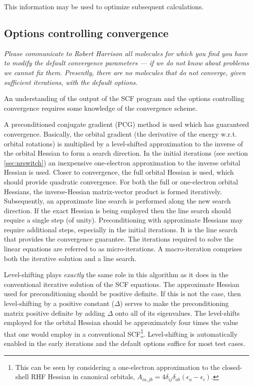 This information may be used to optimize subsequent calculations.


\subsection{Options controlling convergence}
\label{sec:scfconv}

{\em Please communicate to Robert Harrison all molecules for which you
  find you have to modify the default convergence parameters --- if we
  do not know about problems we cannot fix them.  Presently, there are
  no molecules that do not converge, given sufficient iterations, with
  the default options.}

An understanding of the output of the SCF program and the options
controlling convergence requires some knowledge of the convergence
scheme.

A preconditioned conjugate gradient (PCG) method is used which has
guaranteed convergence.  Basically, the orbital gradient (the
derivative of the energy w.r.t. orbital rotations) is multiplied by a
level-shifted approximation to the inverse of the orbital Hessian to
form a search direction.  In the initial iterations (see section
\ref{sec:nrswitch}) an inexpensive one-electron approximation to the
inverse orbital Hessian is used.  Closer to convergence, the full
orbital Hessian is used, which should provide quadratic convergence.
For both the full or one-electron orbital Hessians, the
inverse-Hessian matrix-vector product is formed iteratively.
Subsequently, an approximate line search is performed along the new
search direction.  If the exact Hessian is being employed then the
line search should require a single step (of unity).  Preconditioning
with approximate Hessians may require additional steps, especially in
the initial iterations.  It is the line search that provides the
convergence guarantee.  The iterations required to solve the linear
equations are referred to as micro-iterations.  A macro-iteration
comprises both the iterative solution and a line search.

  Level-shifting plays {\em exactly} the same role in this algorithm
as it does in the conventional iterative solution of the SCF
equations.  The approximate Hessian used for preconditioning should be
positive definite.  If this is not the case, then level-shifting by a
positive constant ($\Delta$) serves to make the preconditioning matrix
positive definite by adding $\Delta$ onto all of its eigenvalues.  The
level-shifts employed for the orbital Hessian should be approximately
four times the value that one would employ in a conventional
SCF\footnote{This can be seen by considering a one-electron
approximation to the closed-shell RHF Hessian in canonical orbitals,
$A_{ia,jb} = 4 \delta_{ij} \delta_{ab} (\epsilon_a - \epsilon_i)$.}.
Level-shifting is automatically enabled in the early iterations and
the default options suffice for most test cases.

